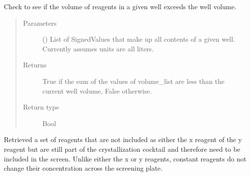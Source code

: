 \documentclass[letterpaper,10pt,english]{sphinxmanual}
\begin{document}
\begin{fulllineitems}
\begin{fulllineitems}
\end{fulllineitems}


\begin{fulllineitems}
\label{\detokenize{polo.widgets:polo.widgets.optimize_widget.OptimizeWidget.check_for_overflow}}
Check to see if the volume of reagents in a given well exceeds
the well volume.
\begin{quote}\begin{description}
\item[{Parameters}] \leavevmode
{} () \textendash{} List of SignedValues that make up all contents             of a given well. Currently assumes units are all liters.

\item[{Returns}] \leavevmode
True if the sum of the values of volume\_list are less than            the current well volume, False otherwise.

\item[{Return type}] \leavevmode
Bool

\end{description}\end{quote}

\end{fulllineitems}


\begin{fulllineitems}
\label{\detokenize{polo.widgets:polo.widgets.optimize_widget.OptimizeWidget.constant_reagents}}
Retrieved a set of reagents that are not included as either the
x reagent of the y reagent but are still part of the crystallization
cocktail and therefore need to be included in the screen. Unlike
either the x or y reagents, constant reagents do not change their
concentration across the screening plate.

\end{fulllineitems}


\end{fulllineitems}
\end{document}
